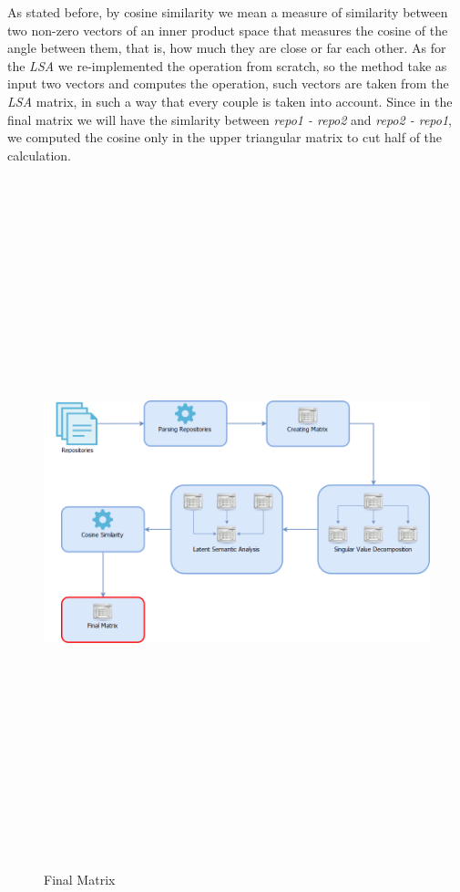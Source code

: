 As stated before, by cosine similarity we mean a measure of similarity between two non-zero vectors of an inner product space that measures the cosine of the angle between them, that is, how much they are close or far each other. As for the \emph{LSA} we re-implemented the operation from scratch, so the method take as input two vectors and computes the operation, such vectors are taken from the \emph{LSA} matrix, in such a way that every couple is taken into account. Since in the final matrix we will have the simlarity between \emph{repo1 - repo2} and \emph{repo2 - repo1}, we computed the cosine only in the upper triangular matrix to cut half of the calculation.

\begin{figure}[H]
\includegraphics[width=15cm,height=20cm,keepaspectratio]{images/Architecture6.png}
\caption{Final Matrix}
\end{figure}

